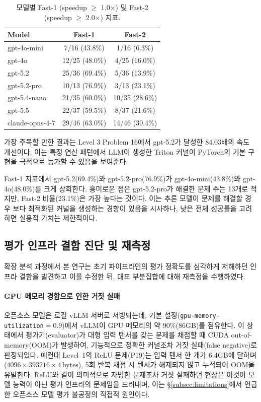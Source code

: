 \documentclass[sigplan,screen,review,anonymous]{acmart}
\begin{document}
\begin{table}[t]
\centering
\caption{모델별 Fast-1 (speedup $\geq$ 1.0$\times$) 및 Fast-2 (speedup $\geq$ 2.0$\times$) 지표.}
\label{tab:fast_metrics}
\begin{tabular}{lcc}
\toprule
\textbf{Model} & \textbf{Fast-1} & \textbf{Fast-2} \\
\midrule
gpt-4o-mini & 7/16 (43.8\%) & 1/16 (6.3\%) \\
gpt-4o & 12/25 (48.0\%) & 4/25 (16.0\%) \\
gpt-5.2 & 25/36 (69.4\%) & 5/36 (13.9\%) \\
gpt-5.2-pro & 10/13 (76.9\%) & 3/13 (23.1\%) \\
\hdashline
gpt-5.4-nano & 21/35 (60.0\%) & 10/35 (28.6\%) \\
gpt-5.5 & 22/37 (59.5\%) & 8/37 (21.6\%) \\
claude-opus-4-7 & 29/46 (63.0\%) & 14/46 (30.4\%) \\
\bottomrule
\end{tabular}
\end{table}

가장 주목할 만한 결과는 Level 3 Problem 16에서 gpt-5.2가 달성한 84.03배의 속도 개선이다. 이는 특정 연산 패턴에서 LLM이 생성한 Triton 커널이 PyTorch의 기본 구현을 극적으로 능가할 수 있음을 보여준다.

Fast-1 지표에서 gpt-5.2(69.4\%)와 gpt-5.2-pro(76.9\%)가 gpt-4o-mini(43.8\%)와 gpt-4o(48.0\%)를 크게 상회한다. 흥미로운 점은 gpt-5.2-pro가 해결한 문제 수는 13개로 적지만, Fast-2 비율(23.1\%)은 가장 높다는 것이다. 이는 추론 모델이 문제를 해결할 경우 보다 최적화된 커널을 생성하는 경향이 있음을 시사하나, 낮은 전체 성공률을 고려하면 실용적 가치는 제한적이다.


\subsection{평가 인프라 결함 진단 및 재측정}
\label{subsec:infra_remeasure}

확장 분석 과정에서 본 연구는 초기 파이프라인의 평가 정확도를 심각하게 저해하던 인프라 결함을 발견하고 이를 수정한 뒤, 대표 부분집합에 대해 재측정을 수행하였다.

\paragraph{GPU 메모리 경합으로 인한 거짓 실패}
오픈소스 모델은 로컬 vLLM 서버로 서빙되는데, 기본 설정(\texttt{gpu-memory-utilization}$=0.9$)에서 vLLM이 GPU 메모리의 약 90\%(86GB)를 점유한다. 이 상태에서 평가기(evaluator)가 대형 입력 텐서를 갖는 문제를 채점할 때 CUDA out-of-memory(OOM)가 발생하여, 기능적으로 정확한 커널조차 거짓 실패(false negative)로 판정되었다. 예컨대 Level~1의 ReLU 문제(P19)는 입력 텐서 한 개가 6.4GB에 달하며($4096\times393216\times4$\,bytes), 5회 반복 채점 시 텐서가 해제되지 않고 누적되어 OOM을 유발한다. ReLU와 같이 의미적으로 자명한 문제조차 거짓 실패하던 현상은 이것이 모델 능력이 아닌 평가 인프라의 문제임을 드러내며, 이는 \S\ref{subsec:limitations}에서 언급한 오픈소스 모델 평가 불공정의 직접적 원인이다.
\end{document}
